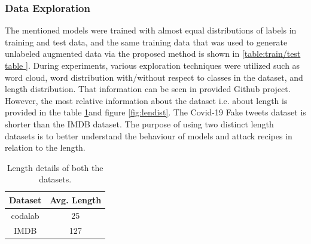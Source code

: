 \documentclass[%
	BCOR=8mm, %
	DIV=12,
	toc=bibliography, %
	toc=listof, %
	oneside, %
	egregdoesnotlikesansseriftitles, %
	]{scrbook}
\begin{document}
\subsubsection{Data Exploration}
\label{subsection:dataexploration}
The mentioned models were trained with almost equal distributions of labels in training and test data, and the same training data that was used to generate unlabeled augmented data via the proposed method is shown in \ref{table:train/test table }.
During experiments, various exploration techniques were utilized such as word cloud, word distribution with/without respect to classes in the dataset, and length distribution. That information can be seen in provided Github project. However, the most relative information about the dataset i.e. about length is provided in the table \ref{table:Length stat }and figure \ref{fig:lendist}.
The Covid-19 Fake tweets dataset is shorter than the IMDB dataset. The purpose of using two distinct length datasets is to better understand the behaviour of models and attack recipes in relation to the length.
\begin{table}[!h]
\centering
\begin{tabular}{ |c|c| }
\hline
Dataset &  Avg. Length  \\
\hline
codalab & 25  \\
IMDB & 127  \\
\hline
\end{tabular}
\caption[Length details of datasets]{Length details of both the datasets.}
\label{table:Length stat }
\end{table}
\end{document}
